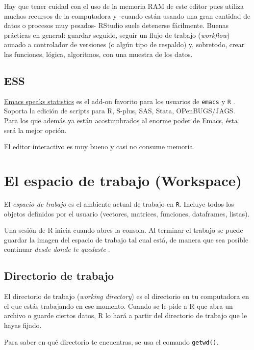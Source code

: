 \documentclass[]{article}
\begin{document}
Hay que tener cuidad con el uso de la memoria RAM de este editor pues
utiliza muchos recursos de la computadora y -cuando están usando una
gran cantidad de datos o procesos muy pesados- RStudio suele detenerse
fácilmente. Buenas prácticas en general: guardar seguido, seguir un
flujo de trabajo (\emph{workflow}) aunado a controlador de versiones (o
algún tipo de respaldo) y, sobretodo, crear las funciones, lógica,
algoritmos, con una muestra de los datos.

\subsection{ESS}\label{ess}

\href{http://ess.r-project.org/}{Emacs speaks statistics} es el add-on
favorito para los usuarios de \texttt{emacs} y \texttt{R}
\parencite{rossini2004ess}. Soporta la edición de scripts para R,
S-plus, SAS, Stata, OPenBUGS/JAGS. Para los que además ya están
acostumbrados al enorme poder de Emacs, ésta será la mejor opción.

El editor interactivo es muy bueno y casi no consume memoria.

\section{El espacio de trabajo
(Workspace)}\label{el-espacio-de-trabajo-workspace}

El \emph{espacio de trabajo} es el ambiente actual de trabajo en
\texttt{R}. Incluye todos los objetos definidos por el usuario
(vectores, matrices, funciones, dataframes, listas).

Una sesión de R inicia cuando abres la consola. Al terminar el trabajo
se puede guardar la imagen del espacio de trabajo tal cual está, de
manera que sea posible continuar \emph{desde donde te quedaste}
\parencite[][p. 11]{kabacoff2015r}.

\subsection{Directorio de trabajo}\label{directorio-de-trabajo}

El directorio de trabajo (\emph{working directory}) es el directorio en
tu computadora en el que estás trabajando en ese momento. Cuando se le
pide a R que abra un archivo o guarde ciertos datos, R lo hará a partir
del directorio de trabajo que le hayas fijado.

Para saber en qué directorio te encuentras, se usa el comando
\texttt{getwd()}.
\end{document}

